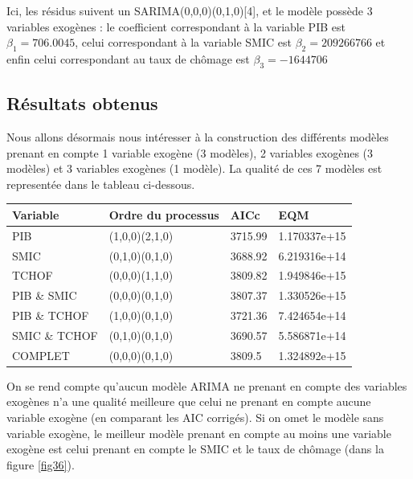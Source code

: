 \documentclass[11pt,]{article}
\begin{document}
Ici, les résidus suivent un SARIMA(0,0,0)(0,1,0){[}4{]}, et le modèle
possède 3 variables exogènes : le coefficient correspondant à la
variable PIB est \(\beta_1 = 706.0045\), celui correspondant à la
variable SMIC est \(\beta_2 = 209266766\) et enfin celui correspondant
au taux de chômage est \(\beta_3 = -1644706\)

\subsection{Résultats obtenus}\label{resultats-obtenus-2}

Nous allons désormais nous intéresser à la construction des différents
modèles prenant en compte 1 variable exogène (3 modèles), 2 variables
exogènes (3 modèles) et 3 variables exogènes (1 modèle). La qualité de
ces 7 modèles est representée dans le tableau ci-dessous.

\begin{longtable}[]{@{}llll@{}}
\toprule
Variable & Ordre du processus & AICc & EQM\tabularnewline
\midrule
\endhead
PIB & (1,0,0)(2,1,0) & 3715.99 & 1.170337e+15\tabularnewline
SMIC & (0,1,0)(0,1,0) & 3688.92 & 6.219316e+14\tabularnewline
TCHOF & (0,0,0)(1,1,0) & 3809.82 & 1.949846e+15\tabularnewline
PIB \& SMIC & (0,0,0)(0,1,0) & 3807.37 & 1.330526e+15\tabularnewline
PIB \& TCHOF & (1,0,0)(0,1,0) & 3721.36 & 7.424654e+14\tabularnewline
SMIC \& TCHOF & (0,1,0)(0,1,0) & 3690.57 & 5.586871e+14\tabularnewline
COMPLET & (0,0,0)(0,1,0) & 3809.5 & 1.324892e+15\tabularnewline
\bottomrule
\end{longtable}

On se rend compte qu'aucun modèle ARIMA ne prenant en compte des
variables exogènes n'a une qualité meilleure que celui ne prenant en
compte aucune variable exogène (en comparant les AIC corrigés). Si on
omet le modèle sans variable exogène, le meilleur modèle prenant en
compte au moins une variable exogène est celui prenant en compte le SMIC
et le taux de chômage (dans la figure \ref{fig36}).
\end{document}
